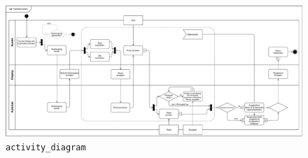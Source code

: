 \documentclass{article}
\begin{document}
\begin{enumerate}[label=\alph*.]
            \begin{figure}[ht]
                \includegraphics[width=\textwidth]{swt_wende_tim_h04_activity_diagram.pdf}
                \caption{\texttt{activity\_diagram}}
            \end{figure}


\end{enumerate}
\end{document}
